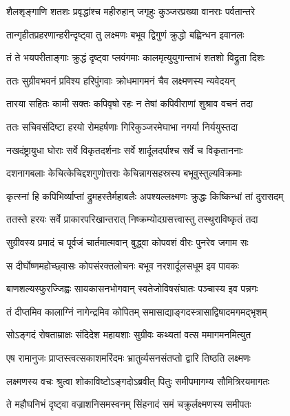 \twolineshloka
{शैलशृङ्गाणि शतशः प्रवृद्धांश्च महीरुहान्}
{जगृहुः कुञ्जरप्रख्या वानराः पर्वतान्तरे} %

\twolineshloka
{तान्गृहीतप्रहरणान्हरीन्दृष्ट्वा तु लक्ष्मणः}
{बभूव द्विगुणं क्रुद्धो बह्विन्धन इवानलः} %

\twolineshloka
{तं ते भयपरीताङ्गाः क्रुद्धं दृष्ट्वा प्लवंगमाः}
{कालमृत्युयुगान्ताभं शतशो विद्रुता दिशः} %

\twolineshloka
{ततः सुग्रीवभवनं प्रविश्य हरिपुंगवाः}
{क्रोधमागमनं चैव लक्ष्मणस्य न्यवेदयन्} %

\twolineshloka
{तारया सहितः कामी सक्तः कपिवृषो रहः}
{न तेषां कपिवीराणां शुश्राव वचनं तदा} %

\twolineshloka
{ततः सचिवसंदिष्टा हरयो रोमहर्षणाः}
{गिरिकुञ्जरमेघाभा नगर्या निर्ययुस्तदा} %

\twolineshloka
{नखदंष्ट्रायुधा घोराः सर्वे विकृतदर्शनाः}
{सर्वे शार्दूलदर्पाश्च सर्वे च विकृताननाः} %

\twolineshloka
{दशनागबलाः केचित्केचिद्दशगुणोत्तराः}
{केचिन्नागसहस्रस्य बभूवुस्तुल्यविक्रमाः} %

\twolineshloka
{कृत्स्नां हि कपिभिर्व्याप्तां द्रुमहस्तैर्महाबलैः}
{अपश्यल्लक्ष्मणः क्रुद्धः किष्किन्धां तां दुरासदम्} %

\twolineshloka
{ततस्ते हरयः सर्वे प्राकारपरिखान्तरात्}
{निष्क्रम्योदग्रसत्त्वास्तु तस्थुराविष्कृतं तदा} %

\twolineshloka
{सुग्रीवस्य प्रमादं च पूर्वजं चार्तमात्मवान्}
{बुद्ध्वा कोपवशं वीरः पुनरेव जगाम सः} %

\twolineshloka
{स दीर्घोष्णमहोच्छ्वासः कोपसंरक्तलोचनः}
{बभूव नरशार्दूलसधूम इव पावकः} %

\twolineshloka
{बाणशल्यस्फुरज्जिह्वः सायकासनभोगवान्}
{स्वतेजोविषसंघातः पञ्चास्य इव पन्नगः} %

\twolineshloka
{तं दीप्तमिव कालाग्निं नागेन्द्रमिव कोपितम्}
{समासाद्याङ्गदस्त्रासाद्विषादमगमद्भृशम्} %

\twolineshloka
{सोऽङ्गदं रोषताम्राक्षः संदिदेश महायशाः}
{सुग्रीवः कथ्यतां वत्स ममागमनमित्युत} %

\twolineshloka
{एष रामानुजः प्राप्तस्त्वत्सकाशमरिंदमः}
{भ्रातुर्व्यसनसंतप्तो द्वारि तिष्ठति लक्ष्मणः} %

\twolineshloka
{लक्ष्मणस्य वचः श्रुत्वा शोकाविष्टोऽङ्गदोऽब्रवीत्}
{पितुः समीपमागम्य सौमित्रिरयमागतः} %

\twolineshloka
{ते महौघनिभं दृष्ट्वा वज्राशनिसमस्वनम्}
{सिंहनादं समं चक्रुर्लक्ष्मणस्य समीपतः} %

